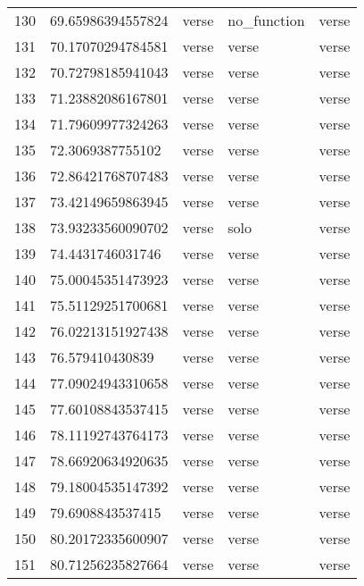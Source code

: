 \begin{table}[]
\begin{tabular}{lllll}
    130  & 69.65986394557824  & verse        & no\_function    & verse          \\
    131  & 70.17070294784581  & verse        & verse           & verse          \\
    132  & 70.72798185941043  & verse        & verse           & verse          \\
    133  & 71.23882086167801  & verse        & verse           & verse          \\
    134  & 71.79609977324263  & verse        & verse           & verse          \\
    135  & 72.3069387755102   & verse        & verse           & verse          \\
    136  & 72.86421768707483  & verse        & verse           & verse          \\
    137  & 73.42149659863945  & verse        & verse           & verse          \\
    138  & 73.93233560090702  & verse        & solo            & verse          \\
    139  & 74.4431746031746   & verse        & verse           & verse          \\
    140  & 75.00045351473923  & verse        & verse           & verse          \\
    141  & 75.51129251700681  & verse        & verse           & verse          \\
    142  & 76.02213151927438  & verse        & verse           & verse          \\
    143  & 76.579410430839    & verse        & verse           & verse          \\
    144  & 77.09024943310658  & verse        & verse           & verse          \\
    145  & 77.60108843537415  & verse        & verse           & verse          \\
    146  & 78.11192743764173  & verse        & verse           & verse          \\
    147  & 78.66920634920635  & verse        & verse           & verse          \\
    148  & 79.18004535147392  & verse        & verse           & verse          \\
    149  & 79.6908843537415   & verse        & verse           & verse          \\
    150  & 80.20172335600907  & verse        & verse           & verse          \\
    151  & 80.71256235827664  & verse        & verse           & verse          \\

\end{tabular}
\end{table}
